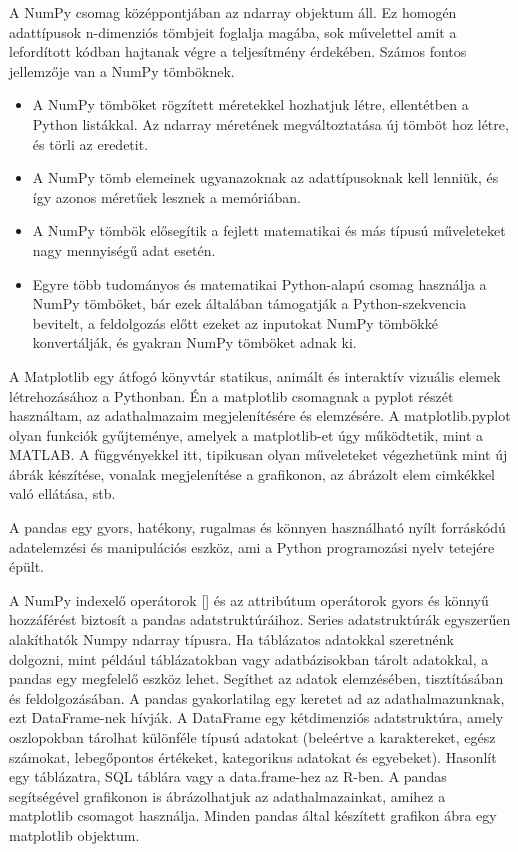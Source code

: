 A NumPy csomag középpontjában az ndarray objektum áll. Ez homogén adattípusok n-dimenziós tömbjeit foglalja magába, sok művelettel amit a lefordított kódban hajtanak végre a teljesítmény érdekében.
Számos fontos jellemzője van a NumPy tömböknek.
\begin{itemize}
\item A NumPy tömböket rögzített méretekkel hozhatjuk létre, ellentétben a Python listákkal.
Az ndarray méretének megváltoztatása új tömböt hoz létre, és törli az eredetit.
\item A NumPy tömb elemeinek ugyanazoknak az adattípusoknak kell lenniük, és így azonos méretűek lesznek a memóriában.
\item A NumPy tömbök elősegítik a fejlett matematikai és más típusú műveleteket nagy mennyiségű adat esetén.
\item Egyre több tudományos és matematikai Python-alapú csomag használja a NumPy tömböket, bár ezek általában támogatják a Python-szekvencia bevitelt, a feldolgozás előtt ezeket az inputokat NumPy tömbökké konvertálják, és gyakran NumPy tömböket adnak ki.
\end{itemize}

A Matplotlib egy átfogó könyvtár statikus, animált és interaktív vizuális elemek létrehozásához a Pythonban.
Én a matplotlib csomagnak a pyplot részét használtam, az adathalmazaim megjelenítésére és elemzésére. A matplotlib.pyplot olyan funkciók gyűjteménye, amelyek a matplotlib-et úgy működtetik, mint a MATLAB. A függvényekkel itt, tipikusan olyan műveleteket végezhetünk mint új ábrák készítése, vonalak megjelenítése a grafikonon, az ábrázolt elem cimkékkel való ellátása, stb.

A pandas egy gyors, hatékony, rugalmas és könnyen használható nyílt forráskódú adatelemzési és manipulációs eszköz, ami a Python programozási nyelv tetejére épült.

A NumPy indexelő operátorok [] és az attribútum operátorok gyors és könnyű hozzáférést biztosít a pandas adatstruktúráihoz. Series adatstruktúrák egyszerűen alakíthatók Numpy ndarray típusra.
Ha táblázatos adatokkal szeretnénk dolgozni, mint például táblázatokban vagy adatbázisokban tárolt adatokkal, a pandas egy megfelelő eszköz lehet. Segíthet az adatok elemzésében, tisztításában és feldolgozásában. A pandas gyakorlatilag egy keretet ad az adathalmazunknak, ezt DataFrame-nek hívják. A DataFrame egy kétdimenziós adatstruktúra, amely oszlopokban tárolhat különféle típusú adatokat (beleértve a karaktereket, egész számokat, lebegőpontos értékeket, kategorikus adatokat és egyebeket). Hasonlít egy táblázatra, SQL táblára vagy a data.frame-hez az R-ben.
A pandas segítségével grafikonon is ábrázolhatjuk az adathalmazainkat, amihez a matplotlib csomagot használja. Minden pandas által készített grafikon ábra egy matplotlib objektum.

